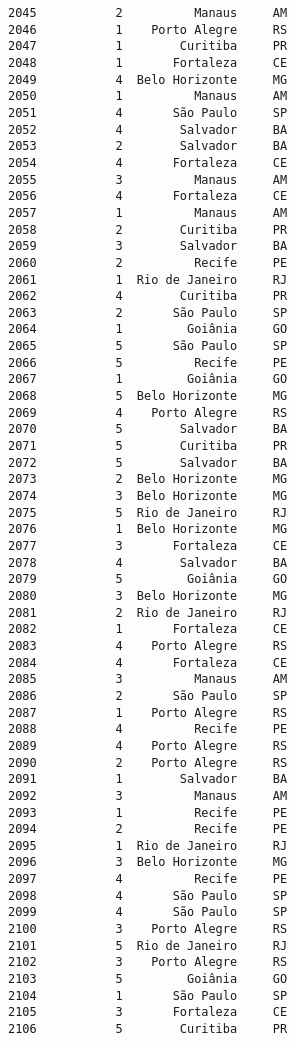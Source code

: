 \documentclass[11pt]{article}
\begin{document}
\begin{Verbatim}[commandchars=\\\{\}]
2045           2          Manaus     AM  
2046           1    Porto Alegre     RS  
2047           1        Curitiba     PR  
2048           1       Fortaleza     CE  
2049           4  Belo Horizonte     MG  
2050           1          Manaus     AM  
2051           4       São Paulo     SP  
2052           4        Salvador     BA  
2053           2        Salvador     BA  
2054           4       Fortaleza     CE  
2055           3          Manaus     AM  
2056           4       Fortaleza     CE  
2057           1          Manaus     AM  
2058           2        Curitiba     PR  
2059           3        Salvador     BA  
2060           2          Recife     PE  
2061           1  Rio de Janeiro     RJ  
2062           4        Curitiba     PR  
2063           2       São Paulo     SP  
2064           1         Goiânia     GO  
2065           5       São Paulo     SP  
2066           5          Recife     PE  
2067           1         Goiânia     GO  
2068           5  Belo Horizonte     MG  
2069           4    Porto Alegre     RS  
2070           5        Salvador     BA  
2071           5        Curitiba     PR  
2072           5        Salvador     BA  
2073           2  Belo Horizonte     MG  
2074           3  Belo Horizonte     MG  
2075           5  Rio de Janeiro     RJ  
2076           1  Belo Horizonte     MG  
2077           3       Fortaleza     CE  
2078           4        Salvador     BA  
2079           5         Goiânia     GO  
2080           3  Belo Horizonte     MG  
2081           2  Rio de Janeiro     RJ  
2082           1       Fortaleza     CE  
2083           4    Porto Alegre     RS  
2084           4       Fortaleza     CE  
2085           3          Manaus     AM  
2086           2       São Paulo     SP  
2087           1    Porto Alegre     RS  
2088           4          Recife     PE  
2089           4    Porto Alegre     RS  
2090           2    Porto Alegre     RS  
2091           1        Salvador     BA  
2092           3          Manaus     AM  
2093           1          Recife     PE  
2094           2          Recife     PE  
2095           1  Rio de Janeiro     RJ  
2096           3  Belo Horizonte     MG  
2097           4          Recife     PE  
2098           4       São Paulo     SP  
2099           4       São Paulo     SP  
2100           3    Porto Alegre     RS  
2101           5  Rio de Janeiro     RJ  
2102           3    Porto Alegre     RS  
2103           5         Goiânia     GO  
2104           1       São Paulo     SP  
2105           3       Fortaleza     CE  
2106           5        Curitiba     PR  

\end{Verbatim}
\end{document}
